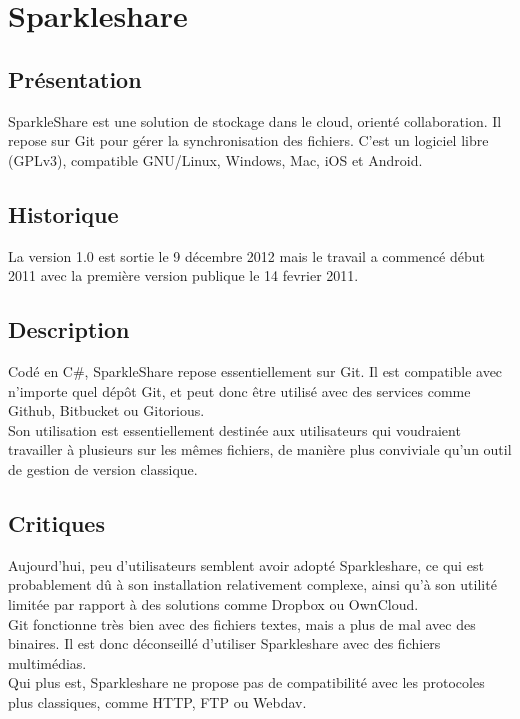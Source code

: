 \chapter{Sparkleshare}
\thispagestyle{EIP} %
\section{Présentation}
SparkleShare est une solution de stockage dans le cloud, orienté collaboration. Il repose sur Git pour gérer la synchronisation des fichiers. C'est un logiciel libre (GPLv3), compatible GNU/Linux, Windows, Mac, iOS et Android.\\

\section{Historique}
La version 1.0 est sortie le 9 décembre 2012 mais le travail a commencé début 2011 avec la première version publique le 14 fevrier 2011.\\

\section{Description}
Codé en C\#, SparkleShare repose essentiellement sur Git. Il est compatible avec n'importe quel dépôt Git, et peut donc être utilisé avec des services comme Github, Bitbucket ou Gitorious.\\

Son utilisation est essentiellement destinée aux utilisateurs qui voudraient travailler à plusieurs sur les mêmes fichiers, de manière plus conviviale qu'un outil de gestion de version classique.\\

\section{Critiques}
Aujourd'hui, peu d'utilisateurs semblent avoir adopté Sparkleshare, ce qui est probablement dû à son installation relativement complexe, ainsi qu'à son utilité limitée par rapport à des solutions comme Dropbox ou OwnCloud.\\

Git fonctionne très bien avec des fichiers textes, mais a plus de mal avec des binaires. Il est donc déconseillé d'utiliser Sparkleshare avec des fichiers multimédias.\\
Qui plus est, Sparkleshare ne propose pas de compatibilité avec les protocoles plus classiques, comme HTTP, FTP ou Webdav.\\